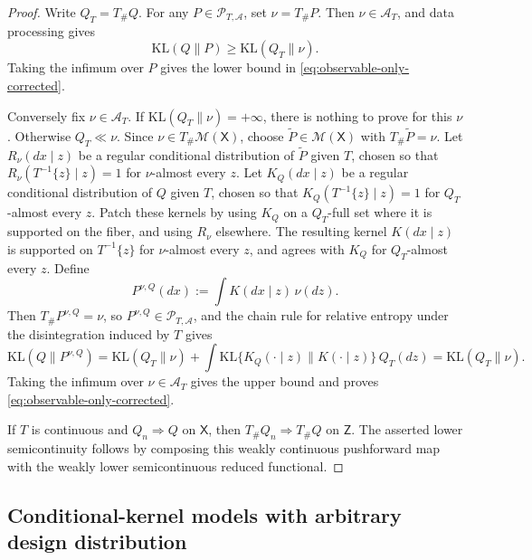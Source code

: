 \documentclass[11pt]{article}
\newcommand{\KL}{\mathrm{KL}}
\newcommand{\Pcal}{\mathcal{P}}
\newcommand{\X}{\mathsf{X}}
\newcommand{\M}{\mathcal{M}}
\theoremstyle{definition}
\theoremstyle{definition}
\begin{document}
\begin{proof}
Write \(Q_T=T_\#Q\).  For any \(P\in\Pcal_{T,\mathcal A}\), set \(\nu=T_\#P\).  Then \(\nu\in\mathcal A_T\), and data processing gives
\[
  \KL(Q\|P)\ge \KL(Q_T\|\nu).
\]
Taking the infimum over \(P\) gives the lower bound in \eqref{eq:observable-only-corrected}.

Conversely fix \(\nu\in\mathcal A_T\).  If \(\KL(Q_T\|\nu)=+\infty\), there is nothing to prove for this \(\nu\).  Otherwise \(Q_T\ll\nu\).  Since \(\nu\in T_\#\M(\X)\), choose \(\widetilde P\in\M(\X)\) with \(T_\#\widetilde P=\nu\).  Let \(R_\nu(dx\mid z)\) be a regular conditional distribution of \(\widetilde P\) given \(T\), chosen so that \(R_\nu(T^{-1}\{z\}\mid z)=1\) for \(\nu\)-almost every \(z\).  Let \(K_Q(dx\mid z)\) be a regular conditional distribution of \(Q\) given \(T\), chosen so that \(K_Q(T^{-1}\{z\}\mid z)=1\) for \(Q_T\)-almost every \(z\).  Patch these kernels by using \(K_Q\) on a \(Q_T\)-full set where it is supported on the fiber, and using \(R_\nu\) elsewhere.  The resulting kernel \(K(dx\mid z)\) is supported on \(T^{-1}\{z\}\) for \(\nu\)-almost every \(z\), and agrees with \(K_Q\) for \(Q_T\)-almost every \(z\).  Define
\[
  P^{\nu,Q}(dx):=\int K(dx\mid z)\,\nu(dz).
\]
Then \(T_\#P^{\nu,Q}=\nu\), so \(P^{\nu,Q}\in\Pcal_{T,\mathcal A}\), and the chain rule for relative entropy under the disintegration induced by \(T\) gives
\[
  \KL(Q\|P^{\nu,Q})
  =
  \KL(Q_T\|\nu)
  +
  \int \KL\{K_Q(\cdot\mid z)\|K(\cdot\mid z)\}\,Q_T(dz)
  =
  \KL(Q_T\|\nu).
\]
Taking the infimum over \(\nu\in\mathcal A_T\) gives the upper bound and proves \eqref{eq:observable-only-corrected}.

If \(T\) is continuous and \(Q_n\Rightarrow Q\) on \(\X\), then \(T_\#Q_n\Rightarrow T_\#Q\) on \(\mathsf Z\).  The asserted lower semicontinuity follows by composing this weakly continuous pushforward map with the weakly lower semicontinuous reduced functional.
\end{proof}





\subsection{Conditional-kernel models with arbitrary design distribution}
\end{document}
